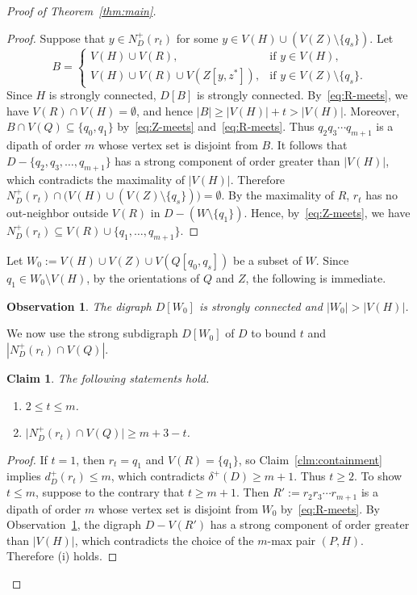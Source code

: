 \documentclass[10pt,a4paper]{amsart}
\newtheorem{claim}{Claim}
\newtheorem{observation}{Observation}
\begin{document}
\begin{proof}[Proof of Theorem~\ref{thm:main}]
\begin{proof}
Suppose that $y\in N_D^+(r_t)$ for some $y\in V(H)\cup(V(Z)\setminus\{q_s\})$.
Let
\[
B=
\begin{cases}
V(H)\cup V(R),&\text{if }y\in V(H),\\
V(H)\cup V(R)\cup V(Z[y,z^*]),&\text{if }y\in V(Z)\setminus\{q_s\}.
\end{cases}
\]
Since $H$ is strongly connected, $D[B]$ is strongly connected.
By~\eqref{eq:R-meets}, we have $V(R)\cap V(H)=\emptyset$, and hence $|B|\ge|V(H)|+t>|V(H)|$.
Moreover, $B\cap V(Q)\subseteq\{q_0,q_1\}$ by~\eqref{eq:Z-meets} and~\eqref{eq:R-meets}.
Thus $q_2q_3\cdots q_{m+1}$ is a dipath of order $m$ whose vertex set is disjoint from $B$.
It follows that $D-\{q_2,q_3,\ldots,q_{m+1}\}$ has a strong component of order greater than $|V(H)|$, which contradicts the maximality of $|V(H)|$.
Therefore $N_D^+(r_t)\cap\bigl(V(H)\cup(V(Z)\setminus\{q_s\})\bigr)=\emptyset$.
By the maximality of $R$, $r_t$ has no out-neighbor outside $V(R)$ in $D-(W\setminus\{q_1\})$.
Hence, by~\eqref{eq:Z-meets}, we have $N_D^+(r_t)\subseteq V(R)\cup\{q_1,\ldots,q_{m+1}\}$.
\end{proof}

Let $W_0:=V(H)\cup V(Z)\cup V(Q[q_0,q_s])$ be a subset of $W$.
Since $q_1\in W_0\setminus V(H)$, by the orientations of $Q$ and $Z$, the following is immediate.
\begin{observation}\label{obv:W}
The digraph $D[W_0]$ is strongly connected and $|W_0|>|V(H)|$.
\end{observation}
We now use the strong subdigraph $D[W_0]$ of $D$ to bound $t$ and $|N_D^+(r_t)\cap V(Q)|$.

\begin{claim}\label{clm:outneighbors}
The following statements hold.
\begin{enumerate}[label=\textup{(\roman*)},leftmargin=*,itemsep=1pt]
\item $2\le t\le m$.
\item $\bigl|N_D^+(r_t)\cap V(Q)\bigr|\ge m+3-t$.
\end{enumerate}
\end{claim}

\begin{proof}
If $t=1$, then $r_t=q_1$ and $V(R)=\{q_1\}$, so Claim~\ref{clm:containment} implies $d_D^+(r_t)\le m$, which contradicts $\delta^+(D)\ge m+1$.
Thus $t\ge 2$.
To show $t \le m$, suppose to the contrary that $t\ge m+1$.
Then $R':=r_2r_3\cdots r_{m+1}$ is a dipath of order $m$ whose vertex set is disjoint from $W_0$ by~\eqref{eq:R-meets}.
By Observation~\ref{obv:W}, the digraph $D-V(R')$ has a strong component of order greater than $|V(H)|$, which contradicts the choice of the $m$-max pair $(P,H)$.
Therefore (i) holds.


\end{proof}
\end{proof}
\end{document}
